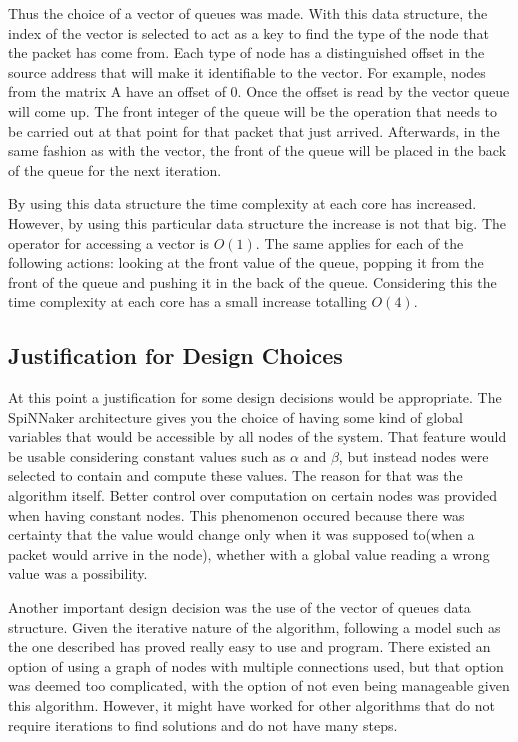 \documentclass[12pt,a4paper]{article}
\begin{document}
Thus the choice of a vector of queues was made. With this data structure, the index of the vector is selected to act as a key to find the type of the node that the packet has come from. Each type of node has a distinguished offset in the source address that will make it identifiable to the vector. For example, nodes from the matrix A have an offset of 0. Once the offset is read by the vector queue will come up. The front integer of the queue will be the operation that needs to be carried out at that point for that packet that just arrived. Afterwards, in the same fashion as with the vector, the front of the queue will be placed in the back of the queue for the next iteration.

By using this data structure the time complexity at each core has increased. However, by using this particular data structure the increase is not that big. The operator for accessing a vector is $O(1)$. The same applies for each of the following actions: looking at the front value of the queue, popping it from the front of the queue and pushing it in the back of the queue. Considering this the time complexity at each core has a small increase totalling $O(4)$.
\subsection{Justification for Design Choices}
At this point a justification for some design decisions would be appropriate. The SpiNNaker architecture gives you the choice of having some kind of global variables that would be accessible by all nodes of the system. That feature would be usable considering constant values such as $\alpha$ and $\beta$, but instead nodes were selected to contain and compute these values. The reason for that was the algorithm itself. Better control over computation on certain nodes was provided when having constant nodes. This phenomenon occured because there was certainty that the value would change only when it was supposed to(when a packet would arrive in the node), whether with a global value reading a wrong value was a possibility.

Another important design decision was the use of the vector of queues data structure. Given the iterative nature of the algorithm, following a model such as the one described has proved really easy to use and program. There existed an option of using a graph of nodes with multiple connections used, but that option was deemed too complicated, with the option of not even being manageable given this algorithm. However, it might have worked for other algorithms that do not require iterations to find solutions and do not have many steps.
\end{document}
